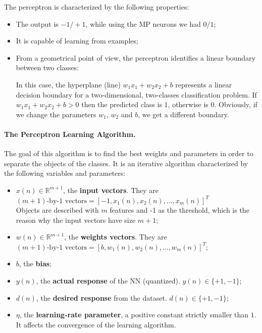 
The perceptron is characterized by the following properties:

\begin{itemize}
    \item The output is $-1/+1$, while using the MP neurons we had $0/1$;
    
    \item It is capable of learning from examples;
    
    \item From a geometrical point of view, the perceptron identifies a linear boundary between two classes:


    In this case, the hyperplane (line) $w_1x_1 + w_2x_2 + b$ represents a linear decision boundary for a two-dimensional, two-classes classification problem. If $w_1x_1 + w_2x_2 + b > 0$ then the predicted class is 1, otherwise is 0. Obviously, if we change the parameters $w_1$, $w_2$ and $b$, we get a different boundary.
    
\end{itemize}

\paragraph*{The Perceptron Learning Algorithm.} The goal of this algorithm is to find the best weights and parameters in order to separate the objects of the classes. It is an iterative algorithm characterized by the following variables and parameters:
\begin{itemize}

	\item $x(n) \in \mathbb{R}^{m+1}$, the \textbf{input vectors}. They are $(m+1)\text{-by-1 vectors} = [-1, x_1(n), x_2(n), \dots, x_m(n)]^T$\\
	Objects are described with $m$ features and -1 as the threshold, which is the reason why the input vectors have size $m+1$;
 
	\item $w(n) \in \mathbb{R}^{m+1}$, the \textbf{weights vectors}. They are $(m+1)\text{-by-1 vectors} = [b, w_1(n), w_2(n), \dots, w_m(n)]^T$;
 
	\item $b$, the \textbf{bias};
 
	\item $y(n)$, the \textbf{actual response} of the NN (quantized). $y(n) \in \{ +1, -1 \}$;
 
	\item $d(n)$, the \textbf{desired response} from the dataset. $d(n) \in \{ +1, -1 \}$;
 
	\item $\eta$, the \textbf{learning-rate parameter}, a positive constant strictly smaller than $1$. It affects the convergence of the learning algorithm. 
\end{itemize}

